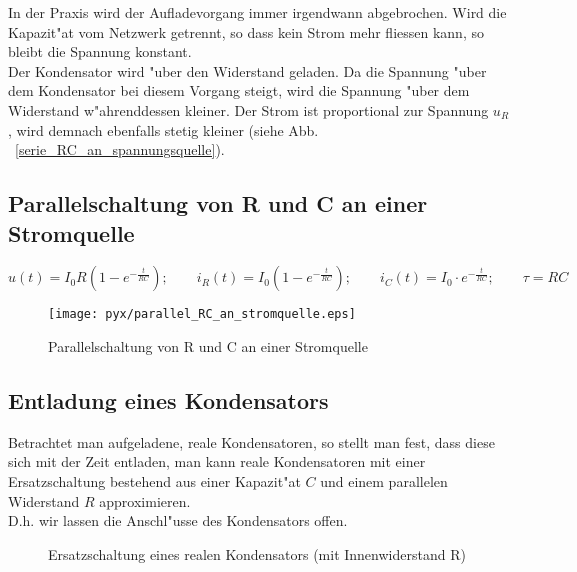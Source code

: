 \documentclass[german, 10pt, a4paper, headsepline]{scrreprt}
\theoremstyle{remark}
\begin{document}
In der Praxis wird der Aufladevorgang immer irgendwann abgebrochen. Wird die Kapazit"at vom Netzwerk getrennt, so dass kein Strom mehr fliessen kann, so bleibt die Spannung konstant.\\

Der Kondensator wird "uber den Widerstand geladen. Da die Spannung "uber dem Kondensator bei diesem Vorgang steigt, wird die Spannung "uber dem Widerstand w"ahrenddessen kleiner. Der Strom ist proportional zur Spannung $u_R$, wird demnach ebenfalls stetig kleiner (siehe Abb. ~\ref{serie_RC_an_spannungsquelle}).

\pagebreak

\subsection{Parallelschaltung von R und C an einer Stromquelle}

\begin{displaymath}
	u(t) = I_0R(1-e^{-\frac{t}{RC}});\qquad i_R(t) = I_0(1-e^{-\frac{t}{RC}});\qquad i_C(t)= I_0\cdotp e^{-\frac{t}{RC}}; \qquad \tau =RC
\end{displaymath}

\begin{figure}[hbt]
 \begin{center}
	\texttt{[image: pyx/parallel\_RC\_an\_stromquelle.eps]}
 \end{center}
 \caption{Parallelschaltung von R und C an einer Stromquelle}
 \label{parallel_RC_an_stromquelle}
\end{figure}

\subsection{Entladung eines Kondensators}

Betrachtet man aufgeladene, reale Kondensatoren, so stellt man fest, dass diese sich mit der Zeit entladen, man kann reale Kondensatoren mit einer Ersatzschaltung bestehend aus einer Kapazit"at $C$ und einem parallelen Widerstand $R$ approximieren.\\

D.h. wir lassen die Anschl"usse des Kondensators offen.

\begin{figure}[hbt]
 
 \centerline{\box\graph}
 \caption{Ersatzschaltung eines realen Kondensators (mit Innenwiderstand R)}
 \label{schalt_entladung}
\end{figure}
\end{document}

